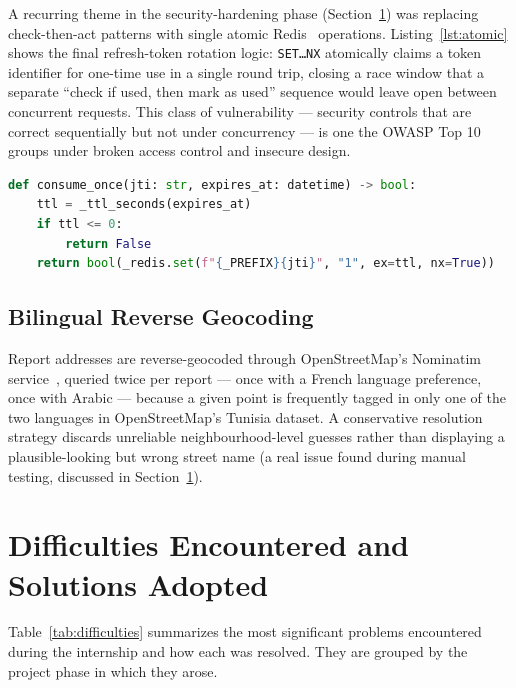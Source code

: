 A recurring theme in the security-hardening phase (Section~\ref{sec:difficultes}) was replacing check-then-act patterns with single atomic Redis~\cite{redis} operations. Listing~\ref{lst:atomic} shows the final refresh-token rotation logic: \texttt{SET\ldots NX} atomically claims a token identifier for one-time use in a single round trip, closing a race window that a separate ``check if used, then mark as used'' sequence would leave open between concurrent requests. This class of vulnerability --- security controls that are correct sequentially but not under concurrency --- is one the OWASP Top 10~\cite{owasp} groups under broken access control and insecure design.

\begin{lstlisting}[language=Python, caption={Atomic one-time-use claim via Redis SET...NX}, label={lst:atomic}]
def consume_once(jti: str, expires_at: datetime) -> bool:
    ttl = _ttl_seconds(expires_at)
    if ttl <= 0:
        return False
    return bool(_redis.set(f"{_PREFIX}{jti}", "1", ex=ttl, nx=True))
\end{lstlisting}

\subsection{Bilingual Reverse Geocoding}

Report addresses are reverse-geocoded through OpenStreetMap's Nominatim service~\cite{nominatim}, queried twice per report --- once with a French language preference, once with Arabic --- because a given point is frequently tagged in only one of the two languages in OpenStreetMap's Tunisia dataset. A conservative resolution strategy discards unreliable neighbourhood-level guesses rather than displaying a plausible-looking but wrong street name (a real issue found during manual testing, discussed in Section~\ref{sec:difficultes}).

\section{Difficulties Encountered and Solutions Adopted}
\label{sec:difficultes}

Table~\ref{tab:difficulties} summarizes the most significant problems encountered during the internship and how each was resolved. They are grouped by the project phase in which they arose.

